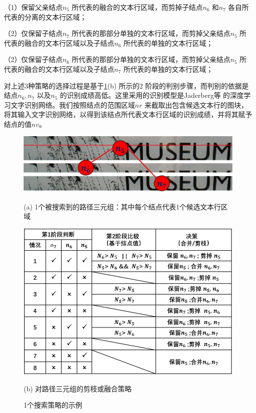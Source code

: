         （1）保留父亲结点$n_5$ 所代表的融合的文本行区域，而剪掉子结点$n_6$ 和$n_7$ 各自所代表的分离的文本行区域；

        （2）仅保留子结点$n_7$ 所代表的那部分单独的文本行区域，而剪掉父亲结点$n_5$ 所代表的融合的文本行区域以及子结点$n_6$ 所代表的单独的文本行区域；

        （2）仅保留子结点$n_6$ 所代表的那部分单独的文本行区域，而剪掉父亲结点$n_5$ 所代表的融合的文本行区域以及子结点$n_7$ 所代表的单独的文本行区域；

        对上述3种策略的选择过程是基于\ref{fig.c4_search_strategy}(b) 所示的2 阶段的判别步骤，而判别的依据是结点$n_6,n_7$ 以及$n_5$ 的识别成绩高低。这里采用的识别模型是Jaderberg等\cite{Jaderberg2016Reading} 的深度学习文字识别网络。我们按照结点的范围区域$nr$ 来截取出包含候选文本行的图块，将其输入文字识别网络，以得到该结点所代表文本行区域的识别成绩，并将其赋予结点的值$nv$。

        \begin{figure}[!h]
        \centering
        \includegraphics[width=\textwidth]{./figures/c4_search_strategy1.jpg}
        \centerline{\small (a) 1个被搜索到的路径三元组：其中每个结点代表1个候选文本行区域 }
        \includegraphics[width=\textwidth]{./figures/c4_search_strategy2.jpg}
        \centerline{\small (b) 对路径三元组的剪枝或融合策略}
        \caption{ 1个搜索策略的示例}
        \label{fig.c4_search_strategy}
        \end{figure}


